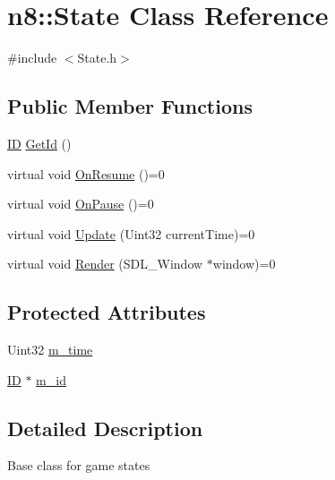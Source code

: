 \hypertarget{classn8_1_1_state}{\section{n8\-:\-:State Class Reference}
\label{classn8_1_1_state}
}


{\ttfamily \#include $<$State.\-h$>$}

\subsection*{Public Member Functions}
\begin{DoxyCompactItemize}
\item 
\hyperlink{class_i_d}{I\-D} \hyperlink{classn8_1_1_state_adbb6b659c390b191bb61f0e160e93eec}{Get\-Id} ()
\item 
virtual void \hyperlink{classn8_1_1_state_acbd41cd50cb1238068cb758862369797}{On\-Resume} ()=0
\item 
virtual void \hyperlink{classn8_1_1_state_a0ba47df708916069474719d872a78481}{On\-Pause} ()=0
\item 
virtual void \hyperlink{classn8_1_1_state_a4a881caf4314fb528f82ad974ad26ef7}{Update} (Uint32 current\-Time)=0
\item 
virtual void \hyperlink{classn8_1_1_state_a1ec9371023ca55c020727a6b49167a91}{Render} (S\-D\-L\-\_\-\-Window $\ast$window)=0
\end{DoxyCompactItemize}
\subsection*{Protected Attributes}
\begin{DoxyCompactItemize}
\item 
Uint32 \hyperlink{classn8_1_1_state_ab8ef61270130e480fd946b62badd6123}{m\-\_\-time}
\item 
\hyperlink{class_i_d}{I\-D} $\ast$ \hyperlink{classn8_1_1_state_a1029f2fda72e7e50369d48f4c9641843}{m\-\_\-id}
\end{DoxyCompactItemize}


\subsection{Detailed Description}
Base class for game states 

